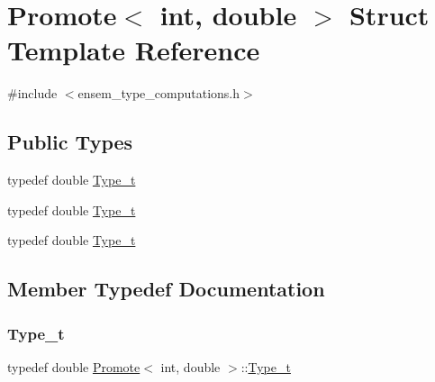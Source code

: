\hypertarget{structPromote_3_01int_00_01double_01_4}{}\section{Promote$<$ int, double $>$ Struct Template Reference}
\label{structPromote_3_01int_00_01double_01_4}


{\ttfamily \#include $<$ensem\+\_\+type\+\_\+computations.\+h$>$}

\subsection*{Public Types}
\begin{DoxyCompactItemize}
\item 
typedef double \mbox{\hyperlink{structPromote_3_01int_00_01double_01_4_afa774ce31e3f3add209e00c1c5b1c369}{Type\+\_\+t}}
\item 
typedef double \mbox{\hyperlink{structPromote_3_01int_00_01double_01_4_afa774ce31e3f3add209e00c1c5b1c369}{Type\+\_\+t}}
\item 
typedef double \mbox{\hyperlink{structPromote_3_01int_00_01double_01_4_afa774ce31e3f3add209e00c1c5b1c369}{Type\+\_\+t}}
\end{DoxyCompactItemize}


\subsection{Member Typedef Documentation}
\mbox{\label{structPromote_3_01int_00_01double_01_4_afa774ce31e3f3add209e00c1c5b1c369}} 
\subsubsection{\texorpdfstring{Type\_t}{Type\_t}\hspace{0.1cm}{\footnotesize\ttfamily [1/3]}}
{\footnotesize\ttfamily typedef double \mbox{\hyperlink{structPromote}{Promote}}$<$ int, double $>$\+::\mbox{\hyperlink{structPromote_3_01int_00_01double_01_4_afa774ce31e3f3add209e00c1c5b1c369}{Type\+\_\+t}}}

\mbox{\label{structPromote_3_01int_00_01double_01_4_afa774ce31e3f3add209e00c1c5b1c369}} 
